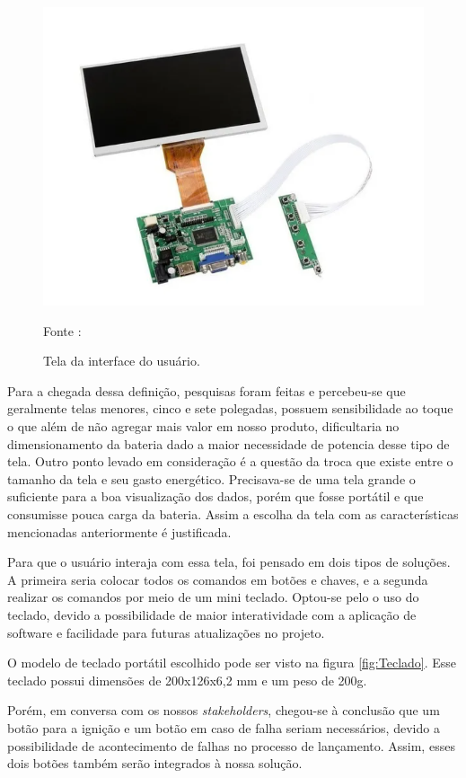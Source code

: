 \begin{figure}[H]
  \centering
  \includegraphics[scale=0.7]{figuras/TELAPI2.png}
  \caption{Tela da interface do usuário. }
  {\footnotesize Fonte : \cite{figura_Tela} } 
  \label{fig:Tela}
\end{figure}

Para a chegada dessa definição, pesquisas foram feitas e percebeu-se que geralmente telas menores, cinco e sete polegadas, possuem sensibilidade ao toque o que além de não agregar mais valor em nosso produto, dificultaria no dimensionamento da bateria dado a maior necessidade de potencia desse tipo de tela. Outro ponto levado em consideração é a questão da troca que existe entre o tamanho da tela e seu gasto energético. Precisava-se de uma tela grande o suficiente para a boa visualização dos dados, porém que fosse portátil e que consumisse pouca carga da bateria. Assim a escolha da tela com as características mencionadas anteriormente é justificada.

Para que o usuário interaja com essa tela, foi pensado em dois tipos de soluções. A primeira seria colocar todos os comandos em botões e chaves, e a segunda realizar os comandos por meio de um mini teclado. Optou-se pelo o uso do teclado, devido a possibilidade de maior interatividade com a aplicação de software e facilidade para futuras atualizações no projeto. 

O modelo de teclado portátil escolhido pode ser visto na figura  \ref{fig:Teclado}. Esse teclado possui dimensões de 200x126x6,2 mm e um peso de 200g.

Porém, em conversa com os nossos  \textit{stakeholders}, chegou-se à conclusão que um botão para a ignição e um botão em caso de falha seriam necessários, devido a possibilidade de acontecimento de falhas no processo de lançamento. Assim, esses dois botões também serão integrados à nossa solução.



